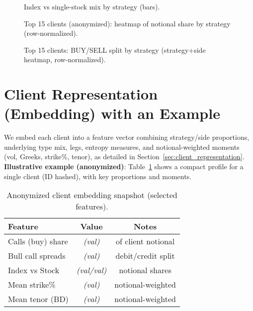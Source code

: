 \documentclass[12pt,a4paper]{report}
\begin{document}
\begin{figure}[h]
\centering
\fbox{\rule{0pt}{2.0in}\rule{.9\linewidth}{0pt}}
\caption{Index vs single-stock mix by strategy (bars).}
\label{fig:index_vs_stock_bars_all}
\end{figure}

\begin{figure}[h]
\centering
\fbox{\rule{0pt}{2.2in}\rule{.95\linewidth}{0pt}}
\caption{Top 15 clients (anonymized): heatmap of notional share by strategy (row-normalized).}
\label{fig:top15_strategy_heatmap}
\end{figure}

\begin{figure}[h]
\centering
\fbox{\rule{0pt}{2.2in}\rule{.95\linewidth}{0pt}}
\caption{Top 15 clients: BUY/SELL split by strategy (strategy+side heatmap, row-normalized).}
\label{fig:top15_strategy_side_heatmap}
\end{figure}

\section{Client Representation (Embedding) with an Example}
\label{sec:client_embedding_example}

We embed each client into a feature vector combining strategy/side proportions, underlying type mix, legs, entropy measures, and notional-weighted moments (vol, Greeks, strike\%, tenor), as detailed in Section~\ref{sec:client_representation}.  
\textbf{Illustrative example (anonymized)}: Table~\ref{tab:client_profile_example} shows a compact profile for a single client (ID hashed), with key proportions and moments.

\begin{table}[h]
\centering
\begin{tabular}{lcc}
\toprule
\textbf{Feature} & \textbf{Value} & \textbf{Notes} \\
\midrule
Calls (buy) share  & \emph{(val)} & of client notional \\
Bull call spreads  & \emph{(val)} & debit/credit split \\
Index vs Stock     & \emph{(val/val)} & notional shares \\
Mean strike\%      & \emph{(val)} & notional-weighted \\
Mean tenor (BD)    & \emph{(val)} & notional-weighted \\
\bottomrule
\end{tabular}
\caption{Anonymized client embedding snapshot (selected features).}
\label{tab:client_profile_example}
\end{table}
\end{document}
